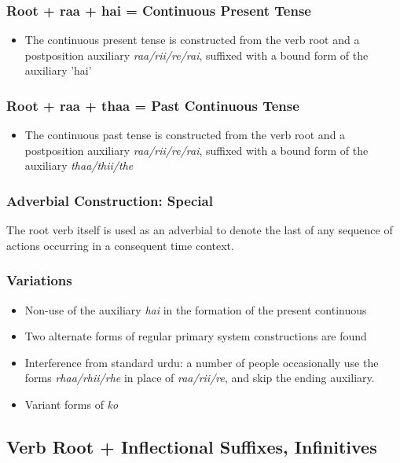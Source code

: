\documentclass[a4paper]{article}
\begin{document}
\subsubsection{Root + raa + hai = Continuous Present Tense}

\begin{itemize}
\item
The continuous present tense is constructed from the verb root and a postposition auxiliary \emph{raa/rii/re/rai}, suffixed with a bound form of the auxiliary 'hai'
\end{itemize}

\subsubsection{Root + raa + thaa = Past Continuous Tense}

\begin{itemize}
\item
The continuous past tense is constructed from the verb root and a postposition auxiliary \emph{raa/rii/re/rai}, suffixed with a bound form of the auxiliary \emph{thaa/thii/the}
\end{itemize}

\subsubsection{Adverbial Construction: Special}

The root verb itself is used as an adverbial to denote the last of any sequence of actions occurring in a consequent time context.

\subsubsection{Variations}

\begin{itemize}
\item
Non-use of the auxiliary \textit{hai} in the formation of the present continuous
\item
Two alternate forms of regular primary system constructions are found
\item
Interference from standard urdu: a number of people occasionally use the forms \emph{rhaa/rhii/rhe} in place of \emph{raa/rii/re}, and skip the ending auxiliary.
\item
Variant forms of \textit{ko}
\end{itemize}

\subsection{Verb Root + Inflectional Suffixes, Infinitives}
\end{document}
